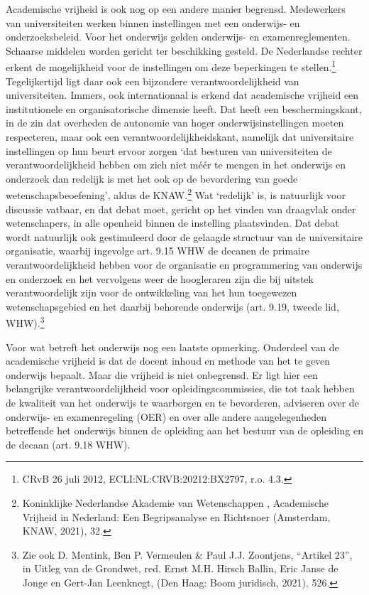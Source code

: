 \documentclass{jote-book}
\begin{document}
	Academische vrijheid is ook nog op een andere manier begrensd. Medewerkers van universiteiten werken binnen instellingen met een onderwijs- en onderzoeksbeleid. Voor het onderwijs gelden onderwijs- en examenreglementen. Schaarse middelen worden gericht ter beschikking gesteld. De Nederlandse rechter erkent de mogelijkheid voor de instellingen om deze beperkingen te stellen.\footnote{CRvB 26 juli 2012, ECLI:NL:CRVB:20212:BX2797, r.o. 4.3.} Tegelijkertijd ligt daar ook een bijzondere verantwoordelijkheid van universiteiten. Immers, ook internationaal is erkend dat academische vrijheid een institutionele en organisatorische dimensie heeft. Dat heeft een beschermingskant, in de zin dat overheden de autonomie van hoger onderwijsinstellingen moeten respecteren, maar ook een verantwoordelijkheidskant, namelijk dat universitaire instellingen op hun beurt ervoor zorgen ‘dat besturen van universiteiten de verantwoordelijkheid hebben om zich niet méér te mengen in het onderwijs en onderzoek dan redelijk is met het ook op de bevordering van goede wetenschapsbeoefening', aldus de KNAW.\footnote{Koninklijke Nederlandse Akademie van Wetenschappen , Academische Vrijheid in Nederland: Een Begripsanalyse en Richtsnoer (Amsterdam, KNAW, 2021), 32.} Wat ‘redelijk' is, is natuurlijk voor discussie vatbaar, en dat debat moet, gericht op het vinden van draagvlak onder wetenschapers, in alle openheid binnen de instelling plaatsvinden. Dat debat wordt natuurlijk ook gestimuleerd door de gelaagde structuur van de universitaire organisatie, waarbij ingevolge art. 9.15 WHW de decanen de primaire verantwoordelijkheid hebben voor de organisatie en programmering van onderwijs en onderzoek en het vervolgens weer de hoogleraren zijn die bij uitstek verantwoordelijk zijn voor de ontwikkeling van het hun toegewezen wetenschapsgebied en het daarbij behorende onderwijs (art. 9.19, tweede lid, WHW).\footnote{Zie ook D. Mentink, Ben P. Vermeulen \& Paul J.J. Zoontjens, “Artikel 23”, in Uitleg van de Grondwet, red. Ernst M.H. Hirsch Ballin, Eric Janse de Jonge en Gert-Jan Leenknegt, (Den Haag: Boom juridisch, 2021), 526.}



	Voor wat betreft het onderwijs nog een laatste opmerking. Onderdeel van de academische vrijheid is dat de docent inhoud en methode van het te geven onderwijs bepaalt. Maar die vrijheid is niet onbegrensd. Er ligt hier een belangrijke verantwoordelijkheid voor opleidingscommissies, die tot taak hebben de kwaliteit van het onderwijs te waarborgen en te bevorderen, adviseren over de onderwijs- en examenregeling (OER) en over alle andere aangelegenheden betreffende het onderwijs binnen de opleiding aan het bestuur van de opleiding en de decaan (art. 9.18 WHW).
\end{document}
